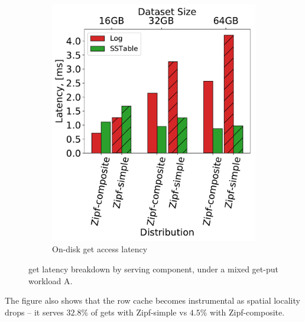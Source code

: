 \begin{figure}[htb]
\begin{subfigure}{0.49\linewidth}
\includegraphics[width=\textwidth]{figs/Latency_A.pdf}
\caption{On-disk get access latency}
\label{fig:readstat:lat}
\end{subfigure}
\caption{{\sys\/ get latency breakdown by serving component, under a mixed get-put workload A.}}
\label{fig:readstat}
\end{figure}

The figure also shows that the row cache becomes instrumental as spatial locality drops -- it serves $32.8\%$ of gets with Zipf-simple 
vs $4.5\%$ with Zipf-composite. 


